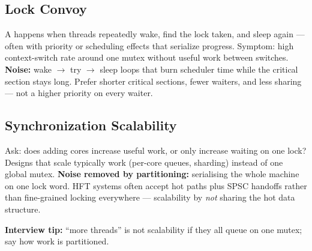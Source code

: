 \subsection{Lock Convoy}
\label{subsec:lock-convoy}
A  happens when threads repeatedly wake, find the lock taken, and sleep 
again --- often with priority or scheduling effects that serialize progress. Symptom: high 
context-switch rate around one mutex without useful work between switches.
\newline
\textbf{Noise:} wake $\rightarrow$ try $\rightarrow$ sleep loops that burn scheduler time 
while the critical section stays long. Prefer shorter critical sections, fewer waiters, 
and less sharing --- not a higher priority on every waiter.

\subsection{Synchronization Scalability}
\label{subsec:scalability}
Ask: does adding cores increase useful work, or only increase waiting on one lock? 
Designs that scale typically  work (per-core queues, sharding) instead of 
one global mutex.
\newline
\textbf{Noise removed by partitioning:} serialising the whole machine on one lock word. 
HFT systems often accept  hot paths plus SPSC handoffs rather than 
fine-grained locking everywhere --- scalability by \emph{not} sharing the hot data structure.
\par\noindent\textbf{Interview tip:} ``more threads'' is not scalability if they all queue on 
one mutex; say how work is partitioned.

